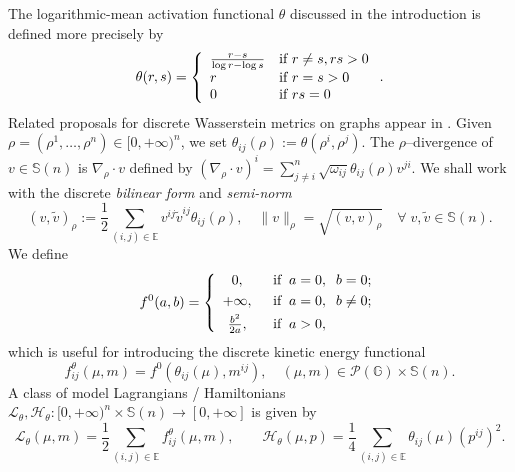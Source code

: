 \documentclass[10pt]{article}
\numberwithin{equation}{section}
\newcommand{\cH}{ \mathcal{H}}
\newcommand{\cL}{ \mathcal{L}}
\newcommand{\cP}{ \mathcal{P}}
\newcommand{\bE}{\mathbb E}
\newcommand{\bG}{\mathbb G}
\newcommand{\bS}{\mathbb S}
\def\cH{\mathcal{H}}
\def\cL{\mathcal{L}}
\begin{document}
The logarithmic-mean activation functional $\theta$ discussed in the introduction is defined more precisely by
\[
\theta(r, s)= \left\{
     \begin{array}{ll}
       {r-s \over \log r-\log s}& \text{if }  r \neq s, rs>0  \\
        r & \text{if } r =s>0\\
       0  & \text{if }  rs=0
     \end{array}
   \right..
\]
Related proposals for discrete Wasserstein metrics on graphs appear in \cite{EM2, GangboLM, GangboMSwiech, Maas}. Given $\rho = (\rho^1,\dots, \rho^n)\in [0,+\infty)^n$, we set $\theta_{ij}(\rho):=\theta(\rho^i, \rho^j)$. The $\rho$--divergence of $v \in \bS(n)$ is $\nabla_\rho \cdot v$ defined by $(\nabla_\rho \cdot v)^i=\sum_{j \not= i}^n \sqrt{\omega_{ij}} \theta_{ij}(\rho) v^{ji}.$ We shall work with the discrete {\em bilinear form} and {\em semi-norm}  
\begin{equation}\label{eq:inner-product-and-norm}
(v,\tilde v )_ \rho:=\frac{1}{2}\sum_{(i,j)\in \bE} v^{ij}\tilde v^{ij}\theta_{ij}(\rho), \quad \|v\|_\rho=\sqrt{(v,v )_ \rho } \quad \forall \; v, \tilde v \in \bS(n).
\end{equation}
We define
\begin{equation}\label{eq:definitionfij}
f^0(a, b)=\left\{
\begin{array}
[c]{cl}
0, &\;\; \text{if}\;\;a=0, \;\; b=0; \smallskip\\
+\infty, &\;\; \text{if}\;\;a=0, \;\; b\not =0; \smallskip\\
\frac{b^2}{2a}, &\;\; \text{if}\;\;a>0,
\end{array}
\right. 
\end{equation} 
which is useful for introducing the discrete kinetic energy functional  
\[
f^\theta_{ij}(\mu, m)=f^0(\theta_{ij}(\mu), m^{ij}),\quad (\mu, m) \in \cP(\bG) \times \bS(n).
\] 
A class of model Lagrangians / Hamiltonians $\cL_\theta, \cH_\theta: [0,+\infty)^n \times \bS(n) \to [0,+\infty]$ is given by
\begin{equation}\label{eq:jan28.2024.1ter}
\cL_\theta(\mu, m)= \frac{1}{2} \sum_{(i, j) \in \bE}f^\theta_{ij}(\mu, m), \qquad \cH_\theta(\mu, p)=\frac{1}{4} \sum_{(i, j) \in \bE}\theta_{ij}(\mu) (p^{ij})^2.
\end{equation} 
\end{document}
